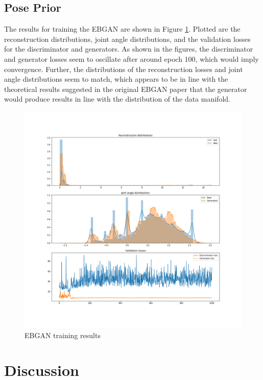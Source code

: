 \documentclass[10pt,twocolumn,letterpaper]{article}
\begin{document}
\subsection{Pose Prior}
The results for training the EBGAN are shown in Figure \ref{fig:ganresults}. Plotted are the reconstruction distributions, joint angle distributions, and the validation losses for the discriminator and generators. As shown in the figures, the discriminator and generator losses seem to oscillate after around epoch 100, which would imply convergence. Further, the distributions of the reconstruction losses and joint angle distributions seem to match, which appears to be in line with the theoretical results suggested in the original EBGAN paper that the generator would produce results in line with the distribution of the data manifold.  
\begin{figure}[h]
\centering
\includegraphics[scale=0.45]{gan_res.png}
\caption{EBGAN training results}
\label{fig:ganresults}
\end{figure}
\section{Discussion}


{\small


}
\end{document}
